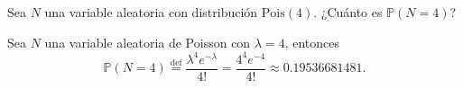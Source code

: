 \question

	Sea $N$ una variable aleatoria con distribución $\mathrm{Pois}(4)$. ¿Cuánto es $\mathds{P}\left(N=4\right)$?

	\begin{solutionordottedlines}
		Sea $N$ una variable aleatoria de Poisson con $\lambda=4$, entonces
		\[
			\mathds{P}\left(N=4\right)\stackrel{\text{def}}{=}\frac{\lambda^{4}e^{-\lambda}}{4!}=\frac{4^{4}e^{-4}}{4!}\approx\num{0.19536681481}.
		\]
	\end{solutionordottedlines}